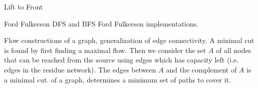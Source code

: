 


\begin{algorithm}{Lift to Front}
\end{algorithm}

\begin{algorithm}{Ford Fulkerson}
\desc
DFS and BFS Ford Fulkerson implementations.
\end{algorithm}

\begin{algorithm}{Flow constructions}
 of a graph, generalization of edge connectivity. A
minimal cut is found by first finding a maximal flow. Then we consider the
set $A$ of all nodes that can be reached from the source using edges which
has capacity left (i.e. edges in the residue network). The edges between
$A$ and the complement of $A$ is a minimal cut.
 of a graph, determines a minimum set of paths to
cover it.
\end{algorithm}
